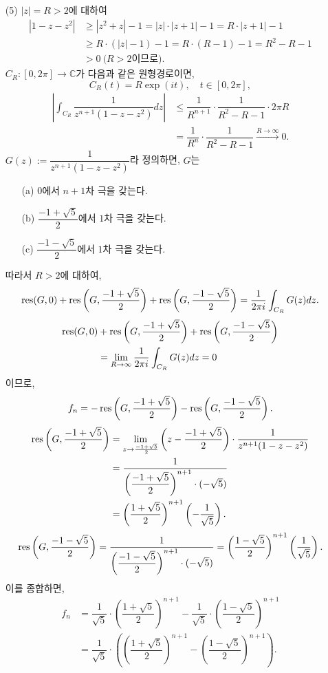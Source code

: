 \begin{itemize}
\item[(5)] $|z|=R>2$에 대하여
\begin{align*}
|1-z-z^2| &\ge |z^2+z| -1 = |z|\cdot|z+1| -1 = R\cdot |z+1| -1 \\
&\ge R\cdot(|z|-1)-1 = R\cdot(R-1) -1 = R^2 -R -1 \\
&>0 \ \text{($R>2$이므로)}.
\end{align*}
$C_R:[0,2\pi] \to \mathbb C$가 다음과 같은 원형경로이면,
\[
C_R(t) = R\exp(it), \quad t\in[0,2\pi],
\]
\begin{align*}
\left| \int_{C_R} \dfrac1{z^{n+1}(1-z-z^2)} dz \right|
&\le \dfrac1{R^{n+1}}\cdot\dfrac1{R^2-R-1}\cdot 2\pi R\\
&= \dfrac1{R^n}\cdot\dfrac1{R^2-R-1}
\stackrel{R\to\infty}{\longrightarrow} 0.
\end{align*}
$G(z):= \dfrac1{z^{n+1}(1-z-z^2)} $라 정의하면, $G$는
\begin{itemize}
\item[(a)] $0$에서 $n+1$차 극을 갖는다.
\item[(b)] $\dfrac{-1+\sqrt{5}}2$에서 $1$차 극을 갖는다.
\item[(c)] $\dfrac{-1-\sqrt{5}}2$에서 $1$차 극을 갖는다.
\end{itemize}
따라서 $R>2$에 대하여,
\[
\mathop{\mathrm{res}}(G,0) + \mathop{\mathrm{res}}\left(G, \displaystyle\frac{-1+\sqrt{5}}2\right)
+ \mathop{\mathrm{res}}\left(G, \displaystyle\frac{-1-\sqrt{5}}2\right) 
= \displaystyle\frac1{2\pi i} \int_{C_R} G(z) dz.
\]
\begin{align*}
\mathop{\mathrm{res}}(G,0) &+ \mathop{\mathrm{res}}\left(G, \displaystyle\frac{-1+\sqrt{5}}2\right)
+ \mathop{\mathrm{res}}\left(G, \displaystyle\frac{-1-\sqrt{5}}2\right) \\
&=  \lim_{R\to\infty} \displaystyle\frac1{2\pi i} \int_{C_R} G(z) dz = 0
\end{align*}
이므로,
\[
f_n = -\mathop{\mathrm{res}}\left(G, \displaystyle\frac{-1+\sqrt{5}}2\right)
- \mathop{\mathrm{res}}\left(G, \displaystyle\frac{-1-\sqrt{5}}2\right).
\]
\begin{align*}
\mathop{\mathrm{res}}\left(G, \displaystyle\frac{-1+\sqrt{5}}2\right)
&= \lim_{z\to \frac{-1+\sqrt{5}}2} \left( z - \displaystyle\frac{-1+\sqrt{5}}2 \right)
\cdot \displaystyle\frac1{z^{n+1}(1-z-z^2)} \\
&= \displaystyle\frac1{\left(\displaystyle\frac{-1+\sqrt{5}}2\right)^{n+1} \cdot(-\sqrt{5})} \\
&= \left(\displaystyle\frac{1+\sqrt{5}}2\right)^{n+1} \left(- \displaystyle\frac1{\sqrt{5}} \right).
\end{align*}
\[
\mathop{\mathrm{res}}\left(G, \displaystyle\frac{-1-\sqrt{5}}2\right)
= \displaystyle\frac1{\left(\displaystyle\frac{-1-\sqrt{5}}2\right)^{n+1} \cdot(-\sqrt{5})} 
= \left(\displaystyle\frac{1-\sqrt{5}}2\right)^{n+1} \left( \displaystyle\frac1{\sqrt{5}} \right).
\]
이를 종합하면,
\begin{align*}
f_n &= \dfrac1{\sqrt{5}} \cdot \left(\dfrac{1+\sqrt{5}}2\right)^{n+1}
- \dfrac1{\sqrt{5}} \cdot \left(\dfrac{1-\sqrt{5}}2\right)^{n+1} \\
&= \dfrac1{\sqrt{5}} \cdot \left( \left(\dfrac{1+\sqrt{5}}2\right)^{n+1}
- \left(\dfrac{1-\sqrt{5}}2\right)^{n+1} \right).
\end{align*}



\end{itemize}












